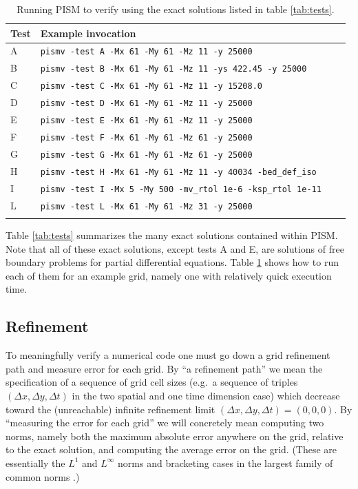 \documentclass[11pt,final]{amsart}
\begin{document}
\begin{table}[h]
\caption{Running PISM to verify using the exact solutions listed in table \ref{tab:tests}.}\label{tab:tests_exec}
\small
\begin{tabular}{@{}llll}\hline
\textbf{Test} & \textbf{Example invocation}  \\ \hline
A & \verb|pismv -test A -Mx 61 -My 61 -Mz 11 -y 25000| \\
B & \verb|pismv -test B -Mx 61 -My 61 -Mz 11 -ys 422.45 -y 25000|  \\
C & \verb|pismv -test C -Mx 61 -My 61 -Mz 11 -y 15208.0|  \\
D & \verb|pismv -test D -Mx 61 -My 61 -Mz 11 -y 25000|  \\
E & \verb|pismv -test E -Mx 61 -My 61 -Mz 11 -y 25000|  \\
F & \verb|pismv -test F -Mx 61 -My 61 -Mz 61 -y 25000|  \\
G & \verb|pismv -test G -Mx 61 -My 61 -Mz 61 -y 25000|  \\
H & \verb|pismv -test H -Mx 61 -My 61 -Mz 11 -y 40034 -bed_def_iso| \\
I & \verb|pismv -test I -Mx 5 -My 500 -mv_rtol 1e-6 -ksp_rtol 1e-11| \\
L & \verb|pismv -test L -Mx 61 -My 61 -Mz 31 -y 25000| \\
\hline
\normalsize
\end{tabular}
\end{table}

Table \ref{tab:tests} summarizes the many exact solutions contained within PISM.  Note that all of these exact solutions, except tests A and E, are solutions of free boundary problems for partial differential equations.  Table \ref{tab:tests_exec} shows how to run each of them for an example grid, namely one with relatively quick execution time.

\subsection{Refinement}  To meaningfully verify a numerical code one must go down a grid refinement path and measure error for each grid.  By ``a refinement path'' we mean the specification of a sequence of grid cell sizes (e.g.~a sequence of triples $(\Delta x,\Delta y,\Delta t)$ in the two spatial and one time dimension case) which decrease toward the (unreachable) infinite refinement limit $(\Delta x,\Delta y,\Delta t) = (0,0,0)$.  By ``measuring the error for each grid'' we will concretely mean computing two norms, namely both the maximum absolute error anywhere on the grid, relative to the exact solution, and computing the average error on the grid.  (These are essentially the $L^1$ and $L^\infty$ norms and bracketing cases in the largest family of common norms \cite{ReedSimon}.)
\end{document}
